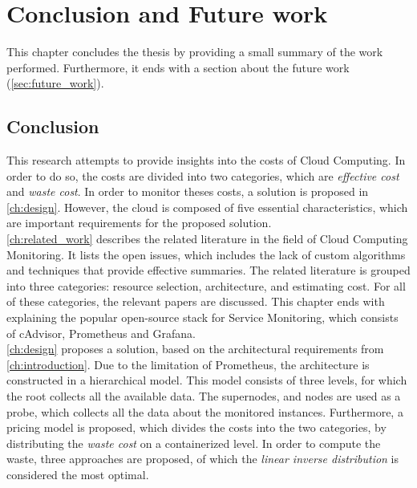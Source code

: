\chapter{Conclusion and Future work}\label{ch:conclusion}
This chapter concludes the thesis by providing a small summary of the work performed. Furthermore, it ends with a section about the future work (\autoref{sec:future_work}).

\section{Conclusion}
This research attempts to provide insights into the costs of Cloud Computing. In order to do so, the costs are divided into two categories, which are \textit{effective cost} and \textit{waste cost}. In order to monitor theses costs, a solution is proposed in \autoref{ch:design}. However, the cloud is composed of five essential characteristics, which are important requirements for the proposed solution.\\

\noindent
\autoref{ch:related_work} describes the related literature in the field of Cloud Computing Monitoring. It lists the open issues, which includes the lack of custom algorithms and techniques that provide effective summaries. The related literature is grouped into three categories: resource selection, architecture, and estimating cost. For all of these categories, the relevant papers are discussed. This chapter ends with explaining the popular open-source stack for Service Monitoring, which consists of cAdvisor, Prometheus and Grafana.\\

\noindent
\autoref{ch:design} proposes a solution, based on the architectural requirements from \autoref{ch:introduction}. Due to the limitation of Prometheus, the architecture is constructed in a hierarchical model. This model consists of three levels, for which the root collects all the available data. The supernodes, and nodes are used as a probe, which collects all the data about the monitored instances. Furthermore, a pricing model is proposed, which divides the costs into the two categories, by distributing the \textit{waste cost} on a containerized level. In order to compute the waste, three approaches are proposed, of which the \textit{linear inverse distribution} is considered the most optimal.\\

